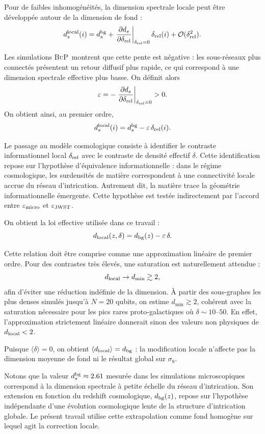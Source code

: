 \documentclass[11pt]{article}
\newcommand{\sig}{\sigma_8}
\newcommand{\BuP}{\textsc{BuP}}
\begin{document}
Pour de faibles inhomogénéités, la dimension spectrale locale peut être développée autour de la dimension de fond :
\[
d_s^{\rm local}(i) = d_s^{\rm bg}
+ \left. \frac{\partial d_s}{\partial \delta_{\rm rel}} \right|_{\delta_{\rm rel}=0}
\delta_{\rm rel}(i) + \mathcal{O}(\delta_{\rm rel}^2).
\]

Les simulations \BuP\ montrent que cette pente est négative : les sous-réseaux plus connectés présentent un retour diffusif plus rapide, ce qui correspond à une dimension spectrale effective plus basse.
On définit alors
\[
\varepsilon = -\left. \frac{\partial d_s}{\partial \delta_{\rm rel}} \right|_{\delta_{\rm rel}=0} > 0.
\]
On obtient ainsi, au premier ordre,
\[
d_s^{\rm local}(i) = d_s^{\rm bg} - \varepsilon \,\delta_{\rm rel}(i).
\]

Le passage au modèle cosmologique consiste à identifier le contraste informationnel local $\delta_{\rm rel}$ avec le contraste de densité effectif $\delta$.
Cette identification repose sur l'hypothèse d'équivalence informationnelle : dans le régime cosmologique, les surdensités de matière correspondent à une connectivité locale accrue du réseau d'intrication.
Autrement dit, la matière trace la géométrie informationnelle émergente.
Cette hypothèse est testée indirectement par l'accord entre $\varepsilon_{\rm micro}$ et $\varepsilon_{\rm JWST}$.

On obtient la loi effective utilisée dans ce travail :
\[
d_{\rm local}(z,\delta) = d_{\rm bg}(z) - \varepsilon \,\delta.
\]

Cette relation doit être comprise comme une approximation linéaire de premier ordre.
Pour des contrastes très élevés, une saturation est naturellement attendue :
\[
d_{\rm local} \rightarrow d_{\min} \gtrsim 2,
\]
afin d'éviter une réduction indéfinie de la dimension.
À partir des sous-graphes les plus denses simulés jusqu'à $N=20$ qubits, on estime $d_{\min} \gtrsim 2$, cohérent avec la saturation nécessaire pour les pics rares proto-galactiques où $\delta \sim 10$--$50$.
En effet, l'approximation strictement linéaire donnerait sinon des valeurs non physiques de $d_{\rm local} < 2$.

Puisque $\langle\delta\rangle = 0$, on obtient $\langle d_{\rm local}\rangle = d_{\rm bg}$ : la modification locale n'affecte pas la dimension moyenne de fond ni le résultat global sur $\sig$.

Notons que la valeur $d_s^{\rm bg} \approx 2.61$ mesurée dans les simulations microscopiques correspond à la dimension spectrale à petite échelle du réseau d'intrication.
Son extension en fonction du redshift cosmologique, $d_{\rm bg}(z)$, repose sur l'hypothèse indépendante d'une évolution cosmologique lente de la structure d'intrication globale.
Le présent travail utilise cette extrapolation comme fond homogène sur lequel agit la correction locale.
\end{document}
